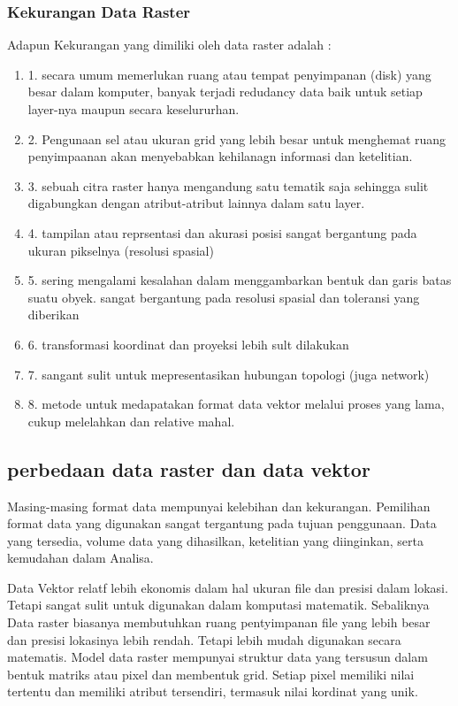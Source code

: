 \subsubsection{Kekurangan Data Raster}
Adapun Kekurangan yang dimiliki oleh data raster adalah :
	\begin{enumerate}
		\item 1. secara umum memerlukan ruang atau tempat penyimpanan (disk) yang besar dalam komputer, banyak terjadi redudancy data baik untuk setiap layer-nya maupun secara keselururhan.
		\item 2. Pengunaan sel atau ukuran grid yang lebih besar untuk menghemat ruang penyimpaanan akan menyebabkan kehilanagn informasi dan ketelitian.
		\item 3. sebuah citra raster hanya mengandung satu tematik saja sehingga sulit digabungkan dengan atribut-atribut lainnya dalam satu layer.
		\item 4. tampilan atau reprsentasi dan akurasi posisi sangat bergantung pada ukuran pikselnya (resolusi spasial)
		\item 5. sering mengalami kesalahan dalam menggambarkan bentuk dan garis batas suatu obyek. sangat bergantung pada resolusi spasial dan toleransi yang diberikan
		\item 6. transformasi koordinat dan proyeksi lebih sult dilakukan
		\item 7. sangant sulit untuk mepresentasikan hubungan topologi (juga network)
		\item 8. metode untuk medapatakan format data vektor melalui proses yang lama, cukup melelahkan dan relative mahal.\cite{irwansyah2013sistem}
	\end{enumerate}

\subsection{perbedaan data raster dan data vektor}
Masing-masing format data mempunyai kelebihan dan kekurangan.
Pemilihan format data yang digunakan sangat tergantung pada tujuan penggunaan. 
Data yang tersedia, volume data yang dihasilkan, ketelitian yang diinginkan, serta kemudahan dalam Analisa.

Data Vektor relatf lebih ekonomis dalam hal ukuran file dan presisi dalam lokasi. Tetapi sangat sulit untuk 
digunakan dalam komputasi matematik.
Sebaliknya Data raster biasanya membutuhkan ruang pentyimpanan file yang lebih besar dan presisi lokasinya lebih rendah.
Tetapi lebih mudah digunakan secara matematis.
Model data raster mempunyai struktur data yang tersusun dalam bentuk matriks atau pixel dan membentuk grid. 
Setiap pixel memiliki nilai tertentu dan memiliki atribut tersendiri, termasuk nilai kordinat yang unik.

